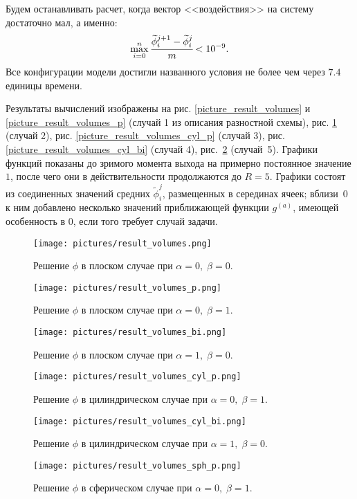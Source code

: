 \documentclass[a4paper,12pt]{article}
\theoremstyle{plain}
\theoremstyle{definition}
\begin{document}
Будем останавливать расчет, когда вектор <<воздействия>> на систему достаточно мал, а именно:
$$\max\limits_{i = 0}^n \cfrac{\widetilde{\phi}_i^{j + 1} - \widetilde{\phi}_i^j}{m} < 10^{-9} \text{.}$$
Все конфигурации модели достигли названного условия не более чем через $7.4$ единицы времени.

Результаты вычислений изображены на рис. \ref{picture_result_volumes} и \ref{picture_result_volumes_p} (случай 1 из описания разностной схемы), рис. \ref{picture_result_volumes_bi} (случай 2), рис. \ref{picture_result_volumes_cyl_p} (случай 3), рис. \ref{picture_result_volumes_cyl_bi} (случай 4), рис.~\ref{picture_result_volumes_sph_p} (случай~5). Графики функций показаны до зримого момента выхода на примерно постоянное значение $1$, после чего они в действительности продолжаются до $R = 5$. Графики состоят из соединенных значений средних $\widetilde{\phi}_i^j$, размещенных в серединах ячеек; вблизи~$0$ к ним добавлено несколько значений приближающей функции $g^{(a)}$, имеющей особенность в $0$, если того требует случай задачи.

\begin{figure}[!tp]
    \centering
    \texttt{[image: pictures/result\_volumes.png]}
    \vspace{-0.3cm}
    \caption{Решение $\phi$ в плоском случае при $\alpha = 0, \; \beta = 0$.}
    \label{picture_result_volumes}
    \vspace{0.5cm}

    \texttt{[image: pictures/result\_volumes\_p.png]}
    \vspace{-0.3cm}
    \caption{Решение $\phi$ в плоском случае при $\alpha = 0, \; \beta = 1$.}
    \label{picture_result_volumes_p}
    \vspace{0.5cm}
    
    \texttt{[image: pictures/result\_volumes\_bi.png]}
    \vspace{-0.3cm}
    \caption{Решение $\phi$ в плоском случае при $\alpha = 1, \; \beta = 0$.}
    \label{picture_result_volumes_bi}
\end{figure}

\begin{figure}[!tp]
    \centering
    \texttt{[image: pictures/result\_volumes\_cyl\_p.png]}
    \vspace{-0.3cm}
    \caption{Решение $\phi$ в цилиндрическом случае при $\alpha = 0, \; \beta = 1$.}
    \label{picture_result_volumes_cyl_p}
    \vspace{0.5cm}

    \texttt{[image: pictures/result\_volumes\_cyl\_bi.png]}
    \vspace{-0.3cm}
    \caption{Решение $\phi$ в цилиндрическом случае при $\alpha = 1, \; \beta = 0$.}
    \label{picture_result_volumes_cyl_bi}
    \vspace{0.5cm}
    
    \texttt{[image: pictures/result\_volumes\_sph\_p.png]}
    \vspace{-0.3cm}
    \caption{Решение $\phi$ в сферическом случае при $\alpha = 0, \; \beta = 1$.}
    \label{picture_result_volumes_sph_p}
\end{figure}
\end{document}
